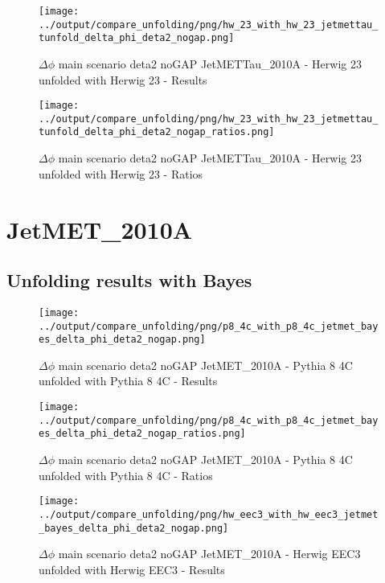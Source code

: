 \documentclass[11pt]{book}
\begin{document}
\begin{figure}[ht]
\centering
\texttt{[image: ../output/compare\_unfolding/png/hw\_23\_with\_hw\_23\_jetmettau\_tunfold\_delta\_phi\_deta2\_nogap.png]}
\caption{$\Delta\phi$ main scenario deta2 noGAP JetMETTau\_2010A - Herwig 23 unfolded with Herwig 23 - Results}
\label{hw_23_hw_23_jetmettau_tunfold_delta_phi_deta2_nogap_a}
\end{figure}

\begin{figure}[ht]
\centering
\texttt{[image: ../output/compare\_unfolding/png/hw\_23\_with\_hw\_23\_jetmettau\_tunfold\_delta\_phi\_deta2\_nogap\_ratios.png]}
\caption{$\Delta\phi$ main scenario deta2 noGAP JetMETTau\_2010A - Herwig 23 unfolded with Herwig 23 - Ratios}
\label{hw_23_hw_23_jetmettau_tunfold_delta_phi_deta2_nogap_b}
\end{figure}


\clearpage
\section{JetMET\_2010A}
\subsection{Unfolding results with Bayes}

\begin{figure}[ht]
\centering
\texttt{[image: ../output/compare\_unfolding/png/p8\_4c\_with\_p8\_4c\_jetmet\_bayes\_delta\_phi\_deta2\_nogap.png]}
\caption{$\Delta\phi$ main scenario deta2 noGAP JetMET\_2010A - Pythia 8 4C unfolded with Pythia 8 4C - Results}
\label{p8_p8_jetmet_bayes_delta_phi_deta2_nogap_a}
\end{figure}

\begin{figure}[ht]
\centering
\texttt{[image: ../output/compare\_unfolding/png/p8\_4c\_with\_p8\_4c\_jetmet\_bayes\_delta\_phi\_deta2\_nogap\_ratios.png]}
\caption{$\Delta\phi$ main scenario deta2 noGAP JetMET\_2010A - Pythia 8 4C unfolded with Pythia 8 4C - Ratios}
\label{p8_p8_jetmet_bayes_delta_phi_deta2_nogap_b}
\end{figure}

\begin{figure}[ht]
\centering
\texttt{[image: ../output/compare\_unfolding/png/hw\_eec3\_with\_hw\_eec3\_jetmet\_bayes\_delta\_phi\_deta2\_nogap.png]}
\caption{$\Delta\phi$ main scenario deta2 noGAP JetMET\_2010A - Herwig EEC3 unfolded with Herwig EEC3 - Results}
\label{hw_eec3_hw_eec3_jetmet_bayes_delta_phi_deta2_nogap_a}
\end{figure}
\end{document}
